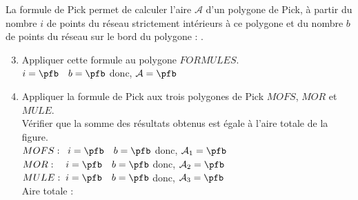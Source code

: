       La formule de Pick permet de calculer l'aire $\mathcal{A}$ d'un polygone de Pick, à partir du nombre $i$ de points du réseau strictement intérieurs à ce polygone et du nombre $b$ de points du réseau sur le bord du polygone : . 
      \begin{enumerate}
      \setcounter{enumi}{2}
          \item Appliquer cette formule au polygone $FORMULES$. \\ [3mm]
            $i =\pfb \quad b =\pfb$ \quad donc, $\mathcal{A} = \pfb$ \\
          \item Appliquer la formule de Pick aux trois polygones de Pick $MOFS$, $MOR$ et $MULE$. \\
         Vérifier que la somme des résultats obtenus est égale à l'aire totale de la figure. \\ [3mm]
         $MOFS : \;\; i =\pfb \quad b =\pfb$ \quad donc, $\mathcal{A}_1 = \pfb$ \\ [3mm]
         $MOR : \quad i =\pfb \quad b =\pfb$ \quad donc, $\mathcal{A}_2 = \pfb$ \\ [3mm]
         $MULE : \; i =\pfb \quad b =\pfb$ \quad donc, $\mathcal{A}_3 = \pfb$ \\ [3mm]
         Aire totale : \pf
      \end{enumerate}


